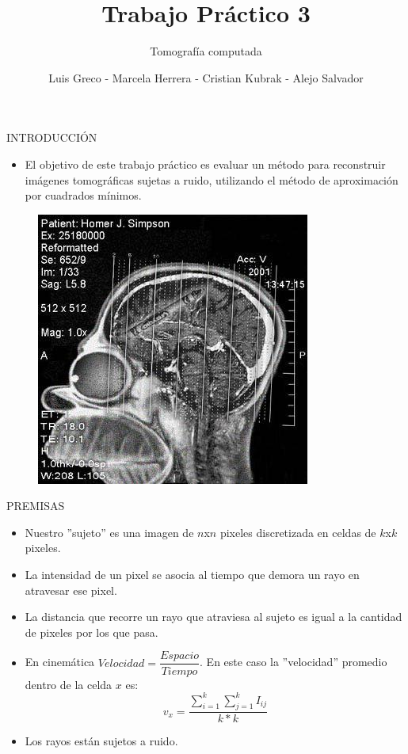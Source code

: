 \documentclass[11pt]{beamer}
\author{Luis Greco - Marcela Herrera - Cristian Kubrak - Alejo Salvador }
\title{Trabajo Práctico 3}
\subtitle{Tomografía computada}
\begin{document}
\begin{frame}
\titlepage 
\end{frame}


\begin{frame}{INTRODUCCIÓN}
\begin{itemize}
\item El objetivo de este trabajo práctico es evaluar un método para reconstruir imágenes tomográficas sujetas a ruido, utilizando el método de aproximación por cuadrados mínimos.
\end{itemize}
\begin{figure}[H]
    \centering
    \includegraphics[scale=0.4]{img/photo_2018-07-05_14-34-53.jpg}
    \label{fig:homero}
\end{figure}
\end{frame}

\begin{frame}{PREMISAS}
\begin{itemize}
\item Nuestro ''sujeto'' es una imagen de $n$x$n$ pixeles discretizada en celdas de $k$x$k$ pixeles.
\item La intensidad de un pixel se asocia al tiempo que demora un rayo en atravesar ese pixel.
\item La distancia que recorre un rayo que atraviesa al sujeto es igual a la cantidad de pixeles por los que pasa.
\item En cinemática $Velocidad = \dfrac{Espacio}{Tiempo}$. En este caso la ''velocidad'' promedio dentro de la celda $x$ es:
\begin{displaymath}
v_{x} =\dfrac{\sum_{i=1}^{k}\sum_{j=1}^{k} I_{ij}}{k*k}
\end{displaymath}
\item Los rayos están sujetos a ruido.
\end{itemize}
\end{frame}
\end{document}
